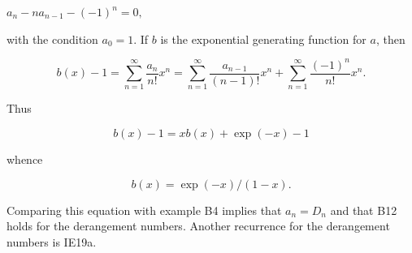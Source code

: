 $a_n - na_{n-1} - (-1)^n = 0,$

with the condition $a_0 = 1$. If $b$ is the exponential generating function for $a$, then

$$b(x) - 1 = \sum_{n=1}^{\infty} \frac{a_n}{n!} x^n = \sum_{n=1}^{\infty} \frac{a_{n-1}}{(n-1)!} x^n + \sum_{n=1}^{\infty} \frac{(-1)^n}{n!} x^n.$$

Thus

$$b(x) - 1 = xb(x) + \exp(-x) - 1$$

whence

$$b(x) = \exp(-x)/(1-x).$$

Comparing this equation with example B4 implies that $a_n = D_n$ and that B12 holds for the derangement numbers. Another recurrence for the derangement numbers is IE19a.

